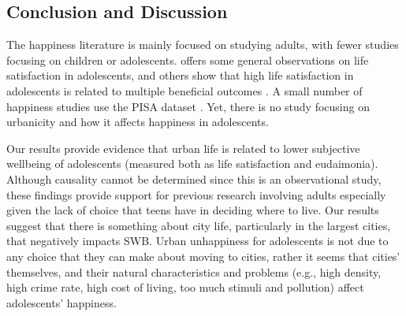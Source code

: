 \documentclass[10pt, letterpaper]{article}
\begin{document}
\begin{spacing}{1.4}
\section*{Conclusion and Discussion}

The happiness literature is mainly focused on studying adults, with fewer studies focusing on children or adolescents. \citet{huebner2004research} offers some general observations on life
satisfaction in adolescents, and  others show that high life satisfaction in
adolescents is related to multiple beneficial outcomes
\citep{proctor2010very,suldo2006extremely}. A small number of happiness studies
use the PISA dataset%
.
Yet, there is no study focusing on urbanicity and how it affects happiness in adolescents. 

Our results provide  evidence that urban life is related to lower subjective
wellbeing of adolescents (measured both as life satisfaction and
eudaimonia). Although causality cannot be determined since this is an
observational study, these findings provide  support for previous research
involving adults %
 especially given the lack of choice that teens have in deciding where to
 live. Our results suggest that there is something about city life, particularly
 in the largest cities,  that negatively impacts SWB. Urban unhappiness for
 adolescents is not due to any choice that they can make about moving to cities,
 rather it seems that cities' themselves, and their natural characteristics and
 problems (e.g., high density, high crime rate, high cost of living, too much
 stimuli and pollution)  affect adolescents' happiness.
 

\end{spacing}
\end{document}
